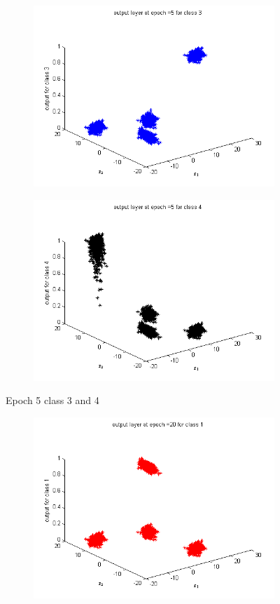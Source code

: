 \documentclass{article}
\begin{document}
\begin{flushleft}
\begin{figure}
\begin{subfigure}{.5\textwidth}
  \centering
  \includegraphics[width=.8\linewidth]{Classification/linearlySeparable/5_3}
 
\end{subfigure}%
\begin{subfigure}{.5\textwidth}
  \centering
  \includegraphics[width=.8\linewidth]{Classification/linearlySeparable/5_4}
  
\end{subfigure}
\caption{Epoch 5 class 3 and 4}
\end{figure}


\begin{figure}
\begin{subfigure}{.5\textwidth}
  \centering
  \includegraphics[width=.8\linewidth]{Classification/linearlySeparable/20_1}
 

\end{subfigure}
\end{figure}
\end{flushleft}
\end{document}

